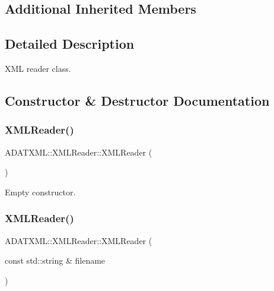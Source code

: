 \subsection*{Additional Inherited Members}


\subsection{Detailed Description}
X\+ML reader class. 

\subsection{Constructor \& Destructor Documentation}
\mbox{\label{classADATXML_1_1XMLReader_a1934189445871612ae9b93f35e17c468}} 
\subsubsection{\texorpdfstring{XMLReader()}{XMLReader()}\hspace{0.1cm}{\footnotesize\ttfamily [1/15]}}
{\footnotesize\ttfamily A\+D\+A\+T\+X\+M\+L\+::\+X\+M\+L\+Reader\+::\+X\+M\+L\+Reader (\begin{DoxyParamCaption}{ }\end{DoxyParamCaption})\hspace{0.3cm}{\ttfamily [inline]}}



Empty constructor. 

\mbox{\label{classADATXML_1_1XMLReader_a85d8af8a27febdd66251e20bd96ccc32}} 
\subsubsection{\texorpdfstring{XMLReader()}{XMLReader()}\hspace{0.1cm}{\footnotesize\ttfamily [2/15]}}
{\footnotesize\ttfamily A\+D\+A\+T\+X\+M\+L\+::\+X\+M\+L\+Reader\+::\+X\+M\+L\+Reader (\begin{DoxyParamCaption}\item[{const std\+::string \&}]{filename }\end{DoxyParamCaption})\hspace{0.3cm}{\ttfamily [inline]}}



